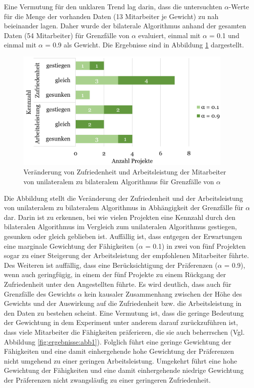 Eine Vermutung für den unklaren Trend lag darin, dass die untersuchten $\alpha$-Werte für die Menge der vorhanden Daten (13 Mitarbeiter je Gewicht) zu nah beieinander lagen.
Daher wurde der bilaterale Algorithmus anhand der gesamten Daten (54 Mitarbeiter) für Grenzfälle von $\alpha$ evaluiert, einmal mit $\alpha$ = 0.1 und einmal mit $\alpha$ = 0.9 als Gewicht.
Die Ergebnisse sind in Abbildung \ref{fig:diskussion:abb1} dargestellt.

\begin{figure}[H]
    \centering
	\includegraphics[width=0.95\textwidth]{gfx/verhaeltnis-z-a-projekte-edge-cases.png}
	\caption[Veränderung von Zufriedenheit und Arbeitsleistung der Mitarbeiter von unilateralem zu bilateralem Algorithmus für Grenzfälle von $\alpha$]{Veränderung von Zufriedenheit und Arbeitsleistung der Mitarbeiter von unilateralem zu bilateralem Algorithmus für Grenzfälle von $\alpha$}
	\label{fig:diskussion:abb1}
\end{figure}

Die Abbildung stellt die Veränderung der Zufriedenheit und der Arbeitsleistung von unilateralem zu bilateralem Algorithmus in Abhängigkeit der Grenzfälle für $\alpha$ dar.
Darin ist zu erkennen, bei wie vielen Projekten eine Kennzahl durch den bilateralen Algorithmus im Vergleich zum unilateralen Algorithmus gestiegen, gesunken oder gleich geblieben ist.
Auffällig ist, dass entgegen der Erwartungen eine marginale Gewichtung der Fähigkeiten ($\alpha$ = 0.1) in zwei von fünf Projekten sogar zu einer Steigerung der Arbeitsleistung der empfohlenen Mitarbeiter führte.
Des Weiteren ist auffällig, dass eine Berücksichtigung der Präferenzen ($\alpha$ = 0.9), wenn auch geringfügig, in einem der fünf Projekte zu einem Rückgang der Zufriedenheit unter den Angestellten führte.
Es wird deutlich, dass auch für Grenzfälle des Gewichts $\alpha$ kein kausaler Zusammenhang zwischen der Höhe des Gewichts und der Auswirkung auf die Zufriedenheit bzw. die Arbeitsleistung in den Daten zu bestehen scheint.
Eine Vermutung ist, dass die geringe Bedeutung der Gewichtung in dem Experiment unter anderem darauf zurückzuführen ist, dass viele Mitarbeiter die Fähigkeiten präferieren, die sie auch beherrschen (Vgl. Abbildung \ref{fig:ergebnisse:abb1}).
Folglich führt eine geringe Gewichtung der Fähigkeiten und eine damit einhergehende hohe Gewichtung der Präferenzen nicht umgehend zu einer geringen Arbeitsleistung.
Umgekehrt führt eine hohe Gewichtung der Fähigkeiten und eine damit einhergehende niedrige Gewichtung der Präferenzen nicht zwangsläufig zu einer geringeren Zufriedenheit.

